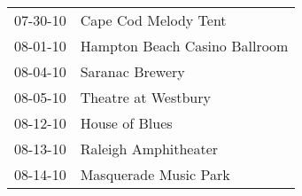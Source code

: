 \begin{supertabular}{p{0.25\columnwidth}p{0.75\columnwidth}}
 07-30-10 &           Cape Cod Melody Tent \\
 08-01-10 &  Hampton Beach Casino Ballroom \\
 08-04-10 &                Saranac Brewery \\
 08-05-10 &            Theatre at Westbury \\
 08-12-10 &                 House of Blues \\
 08-13-10 &           Raleigh Amphitheater \\
 08-14-10 &          Masquerade Music Park \\
\end{supertabular}
